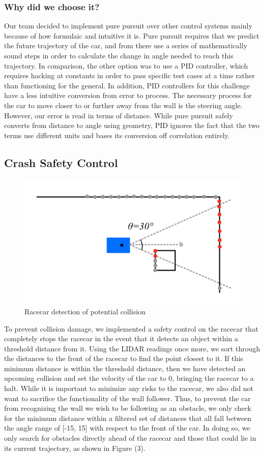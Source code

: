\documentclass{article}
\begin{document}
\subsubsection{Why did we choose it?}
Our team decided to implement pure pursuit over other control systems mainly because of how formulaic and intuitive it is. Pure pursuit requires that we predict the future trajectory of the car, and from there use a series of mathematically sound steps in order to calculate the change in angle needed to reach this trajectory. In comparison, the other option was to use a PID controller, which requires hacking at constants in order to pass specific test cases at a time rather than functioning for the general. In addition, PID controllers for this challenge have a less intuitive conversion from error to process. The necessary process for the car to move closer to or further away from the wall is the steering angle. However, our error is read in terms of distance. While pure pursuit safely converts from distance to angle using geometry, PID ignores the fact that the two terms use different units and bases its conversion off correlation entirely.

\subsection{Crash Safety Control}
\begin{figure}[h!]
\centering
\includegraphics[width=.7\columnwidth]{Screenshot (161).png}
\caption{Racecar detection of potential collision}
\end{figure}
To prevent collision damage, we implemented a safety control on the racecar that completely stops the racecar in the event that it detects an object within a threshold distance from it. Using the LIDAR readings once more, we sort through the distances to the front of the racecar to find the point closest to it. If this minimum distance is within the threshold distance, then we have detected an upcoming collision and set the velocity of the car to 0, bringing the racecar to a halt. While it is important to minimize any risks to the racecar, we also did not want to sacrifice the functionality of the wall follower. Thus, to prevent the car from recognizing the wall we wish to be following as an obstacle, we only check for the minimum distance within a filtered set of distances that all fall between the angle range of [-15, 15] with respect to the front of the car. In doing so, we only search for obstacles directly ahead of the racecar and those that could lie in its current trajectory, as shown in Figure (3).
\end{document}
